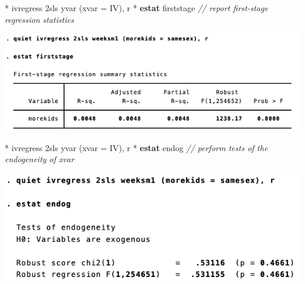 \documentclass[
  10pt,
  ignorenonframetext,
]{beamer}
\newenvironment{Shaded}{\begin{snugshade}}{\end{snugshade}}
\newcommand{\CommentTok}[1]{\textcolor[rgb]{0.56,0.35,0.01}{\textit{#1}}}
\newcommand{\FunctionTok}[1]{\textcolor[rgb]{0.00,0.00,0.00}{#1}}
\newcommand{\KeywordTok}[1]{\textcolor[rgb]{0.13,0.29,0.53}{\textbf{#1}}}
\newcommand{\NormalTok}[1]{#1}
\begin{document}
\begin{frame}[fragile]{}
\protect\hypertarget{section-1}{}
\small

\begin{Shaded}
\begin{Highlighting}[]
\NormalTok{* ivregress 2sls yvar (xvar = IV), }\FunctionTok{r}
\NormalTok{* }\KeywordTok{estat}\NormalTok{ firststage}
\CommentTok{// report first{-}stage regression statistics}
\end{Highlighting}
\end{Shaded}

\begin{center}\includegraphics[width=1\linewidth]{pictures/res4-estatFirstStage} \end{center}
\end{frame}

\begin{frame}[fragile]{}
\protect\hypertarget{section-2}{}
\small

\begin{Shaded}
\begin{Highlighting}[]
\NormalTok{* ivregress 2sls yvar (xvar = IV), }\FunctionTok{r}
\NormalTok{* }\KeywordTok{estat}\NormalTok{ endog}
\CommentTok{// perform tests of the endogeneity of xvar}
\end{Highlighting}
\end{Shaded}

\begin{center}\includegraphics[width=1\linewidth]{pictures/res5-estatEndog} \end{center}
\end{frame}
\end{document}
